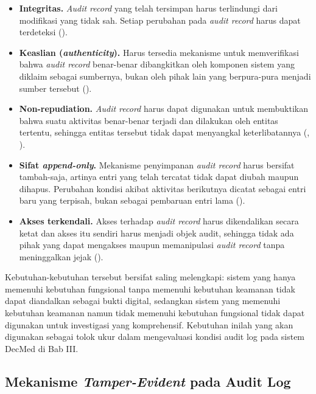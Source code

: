 \begin{itemize}
    \item \textbf{Integritas.} \textit{Audit record} yang telah
    tersimpan harus terlindungi dari modifikasi yang tidak sah.
    Setiap perubahan pada \textit{audit record} harus dapat terdeteksi
    (\cite{iso27789_2021}).

    \item \textbf{Keaslian (\textit{authenticity}).} Harus tersedia
    mekanisme untuk memverifikasi bahwa \textit{audit record}
    benar-benar dibangkitkan oleh komponen sistem yang diklaim sebagai
    sumbernya, bukan oleh pihak lain yang berpura-pura menjadi sumber
    tersebut (\cite{iso27789_2021}).

    \item \textbf{Non-repudiation.} \textit{Audit record} harus dapat
    digunakan untuk membuktikan bahwa suatu aktivitas benar-benar
    terjadi dan dilakukan oleh entitas tertentu, sehingga entitas
    tersebut tidak dapat menyangkal keterlibatannya
    (\cite{shostack2014}, \cite{iso27789_2021}).

    \item \textbf{Sifat \textit{append-only}.} Mekanisme penyimpanan
    \textit{audit record} harus bersifat tambah-saja, artinya entri
    yang telah tercatat tidak dapat diubah maupun dihapus. Perubahan
    kondisi akibat aktivitas berikutnya dicatat sebagai entri baru
    yang terpisah, bukan sebagai pembaruan entri lama
    (\cite{iso27789_2021}).

    \item \textbf{Akses terkendali.} Akses terhadap \textit{audit
    record} harus dikendalikan secara ketat dan akses itu sendiri
    harus menjadi objek audit, sehingga tidak ada pihak yang dapat
    mengakses maupun memanipulasi \textit{audit record} tanpa
    meninggalkan jejak (\cite{iso27789_2021}).
\end{itemize}

Kebutuhan-kebutuhan tersebut bersifat saling melengkapi: sistem yang
hanya memenuhi kebutuhan fungsional tanpa memenuhi kebutuhan keamanan
tidak dapat diandalkan sebagai bukti digital, sedangkan sistem yang
memenuhi kebutuhan keamanan namun tidak memenuhi kebutuhan fungsional
tidak dapat digunakan untuk investigasi yang komprehensif. Kebutuhan
inilah yang akan digunakan sebagai tolok ukur dalam mengevaluasi
kondisi audit log pada sistem DecMed di Bab III.

\subsection{Mekanisme \textit{Tamper-Evident} pada Audit Log}
\label{subsec:mekanisme-tamper-evident}

